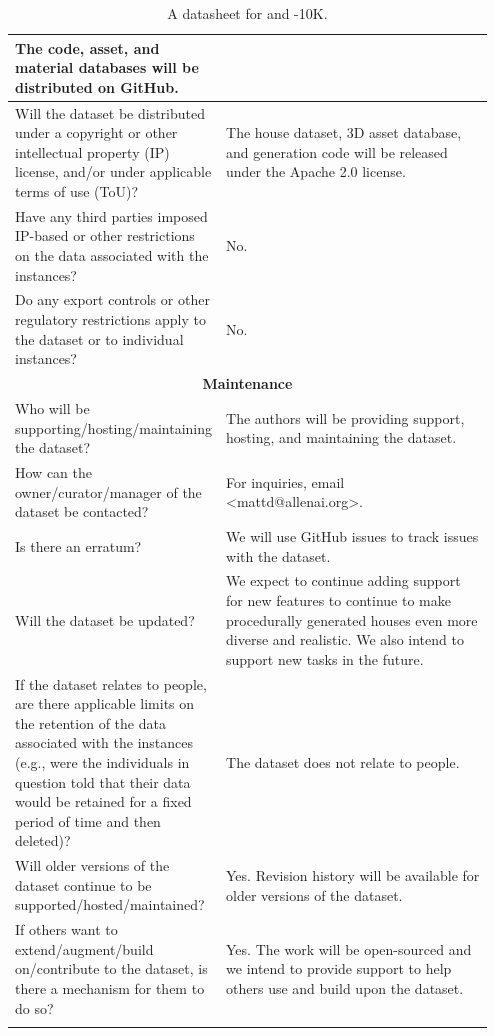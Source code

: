 \begin{longtable}{p{0.35\linewidth} |p{0.6\linewidth} }
    The code, asset, and material databases will be distributed on GitHub.\\[0.15in]
    \midrule
    Will the dataset be distributed under a copyright or other intellectual property (IP) license, and/or under applicable terms of use (ToU)? & The house dataset, 3D asset database, and generation code will be released under the Apache 2.0 license. \\[0.15in]
    \midrule
    Have any third parties imposed IP-based or other restrictions on the data associated with the instances? & No.\\[0.15in]
    \midrule
    Do any export controls or other regulatory restrictions apply to the dataset or to individual instances? & No.\\
    \bottomrule
        \multicolumn{2}{c}{\rule{0in}{0.2in}\textbf{Maintenance}\vspace{0.10in}}\\
    \toprule
    Who will be supporting/hosting/maintaining the dataset? & The authors will be providing support, hosting, and maintaining the dataset.\\[0.15in]
    \midrule
    How can the owner/curator/manager of the dataset be contacted? & For inquiries, email <mattd@allenai.org>.\\[0.15in]
    \midrule
    Is there an erratum? & We will use GitHub issues to track issues with the dataset.\\[0.15in]
    \midrule
    Will the dataset be updated? & We expect to continue adding support for new features to continue to make procedurally generated houses even more diverse and realistic. We also intend to support new tasks in the future.\\[0.15in]
    \midrule
    If the dataset relates to people, are there applicable limits on the retention of the data associated with the instances (e.g., were the individuals in question told that their data would be retained for a fixed period of time and then deleted)? & The dataset does not relate to people. \\[0.15in]
    \midrule
    Will older versions of the dataset continue to be supported/hosted/maintained? & Yes. Revision history will be available for older versions of the dataset.\\[0.15in]
    \midrule
    If others want to extend/augment/build on/contribute to the dataset, is there a mechanism for them to do so? & Yes. The work will be open-sourced and we intend to provide support to help others use and build upon the dataset.\\[0.15in]
\bottomrule
    \caption{A datasheet \cite{Gebru2021DatasheetsFD} for \env{} and \env{}-10K.}
\end{longtable}

